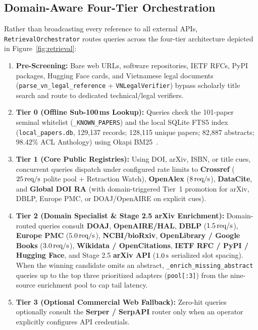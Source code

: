 \subsection{Domain-Aware Four-Tier Orchestration}

Rather than broadcasting every reference to all external APIs, \texttt{Retrieval\allowbreak Orchestrator} routes queries across the four-tier architecture depicted in Figure~\ref{fig:retrieval}:
\begin{enumerate}
    \item \textbf{Pre-Screening:} Bare web URLs, software repositories, IETF RFCs, PyPI packages, Hugging Face cards, and Vietnamese legal documents (\texttt{parse\_vn\_legal\_reference} + \texttt{VNLegalVerifier}) bypass scholarly title search and route to dedicated technical/legal verifiers.
    \item \textbf{Tier 0 (Offline Sub-100\,ms Lookup):} Queries check the 101-paper seminal whitelist (\texttt{\_KNOWN\_PAPERS}) and the local SQLite FTS5 index (\texttt{local\_papers.db}, 129,137 records; 128,115 unique papers; 82,887 abstracts; $98.42\%$ ACL Anthology) using Okapi BM25~\cite{robertson2009bm25}.
    \item \textbf{Tier 1 (Core Public Registries):} Using DOI, arXiv, ISBN, or title cues, concurrent queries dispatch under configured rate limits to \textbf{Crossref} ($25\text{\,req/s}$ polite pool + Retraction Watch), \textbf{OpenAlex} ($8\text{\,req/s}$), \textbf{DataCite}, and \textbf{Global DOI RA} (with domain-triggered Tier~1 promotion for arXiv, DBLP, Europe PMC, or DOAJ/OpenAIRE on explicit cues).
    \item \textbf{Tier 2 (Domain Specialist \& Stage 2.5 arXiv Enrichment):} Domain-routed queries consult \textbf{DOAJ}, \textbf{OpenAIRE/HAL}, \textbf{DBLP} ($1.5\text{\,req/s}$), \textbf{Europe PMC} ($5.0\text{\,req/s}$), \textbf{NCBI/bioRxiv}, \textbf{OpenLibrary / Google Books} ($3.0\text{\,req/s}$), \textbf{Wikidata / OpenCitations}, \textbf{IETF RFC / PyPI / Hugging Face}, and Stage 2.5 \textbf{arXiv API} ($1.0\text{\,s}$ serialized slot spacing). When the winning candidate omits an abstract, \texttt{\_enrich\_missing\_abstract} queries up to the top three prioritized adapters (\texttt{pool[:3]}) from the nine-source enrichment pool to cap tail latency.
    \item \textbf{Tier 3 (Optional Commercial Web Fallback):} Zero-hit queries optionally consult the \textbf{Serper / SerpAPI} router only when an operator explicitly configures API credentials.
\end{enumerate}

